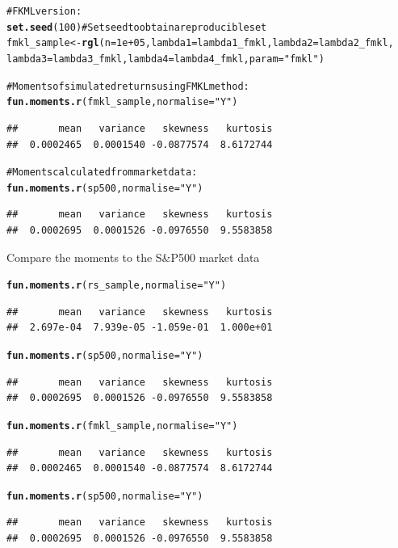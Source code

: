 \documentclass[12pt, a4paper, oneside]{article}\usepackage{graphicx, color}
\makeatletter
\newcommand{\hlfunctioncall}[1]{\textcolor[rgb]{0.501960784313725,0,0.329411764705882}{\textbf{#1}}}%
\newcommand{\hlstring}[1]{\textcolor[rgb]{0.6,0.6,1}{#1}}%
\newcommand{\hlcomment}[1]{\textcolor[rgb]{0.180392156862745,0.6,0.341176470588235}{#1}}%
\newenvironment{kframe}{%
 \def\at@end@of@kframe{}%
 \ifinner\ifhmode%
  \def\at@end@of@kframe{\end{minipage}}%
  \begin{minipage}{\columnwidth}%
 \fi\fi%
 \def\FrameCommand##1{\hskip\@totalleftmargin \hskip-\fboxsep
 \colorbox{shadecolor}{##1}\hskip-\fboxsep
     \hskip-\linewidth \hskip-\@totalleftmargin \hskip\columnwidth}%
 \MakeFramed {\advance\hsize-\width
   \@totalleftmargin\z@ \linewidth\hsize
   \@setminipage}}%
 {\par\unskip\endMakeFramed%
 \at@end@of@kframe}
\newenvironment{knitrout}{}{} %
\makeatother
\begin{document}
\begin{knitrout}
\begin{kframe}
\begin{alltt}
\hlcomment{# FKML version:}
\hlfunctioncall{set.seed}(100)  \hlcomment{# Set seed to obtain a reproducible set}
fmkl_sample <- \hlfunctioncall{rgl}(n = 1e+05, lambda1 = lambda1_fmkl, lambda2 = lambda2_fmkl, 
    lambda3 = lambda3_fmkl, lambda4 = lambda4_fmkl, param = \hlstring{"fmkl"})

\hlcomment{# Moments of simulated returns using FMKL method:}
\hlfunctioncall{fun.moments.r}(fmkl_sample, normalise = \hlstring{"Y"})
\end{alltt}
\begin{verbatim}
##       mean   variance   skewness   kurtosis 
##  0.0002465  0.0001540 -0.0877574  8.6172744
\end{verbatim}
\begin{alltt}

\hlcomment{# Moments calculated from market data:}
\hlfunctioncall{fun.moments.r}(sp500, normalise = \hlstring{"Y"})
\end{alltt}
\begin{verbatim}
##       mean   variance   skewness   kurtosis 
##  0.0002695  0.0001526 -0.0976550  9.5583858
\end{verbatim}
\end{kframe}
\end{knitrout}

Compare the moments to the S\&P500 market data
\begin{knitrout}
\color{fgcolor}\begin{kframe}
\begin{alltt}
\hlfunctioncall{fun.moments.r}(rs_sample, normalise = \hlstring{"Y"})
\end{alltt}
\begin{verbatim}
##       mean   variance   skewness   kurtosis 
##  2.697e-04  7.939e-05 -1.059e-01  1.000e+01
\end{verbatim}
\begin{alltt}
\hlfunctioncall{fun.moments.r}(sp500, normalise = \hlstring{"Y"})
\end{alltt}
\begin{verbatim}
##       mean   variance   skewness   kurtosis 
##  0.0002695  0.0001526 -0.0976550  9.5583858
\end{verbatim}
\begin{alltt}
\hlfunctioncall{fun.moments.r}(fmkl_sample, normalise = \hlstring{"Y"})
\end{alltt}
\begin{verbatim}
##       mean   variance   skewness   kurtosis 
##  0.0002465  0.0001540 -0.0877574  8.6172744
\end{verbatim}
\begin{alltt}
\hlfunctioncall{fun.moments.r}(sp500, normalise = \hlstring{"Y"})
\end{alltt}
\begin{verbatim}
##       mean   variance   skewness   kurtosis 
##  0.0002695  0.0001526 -0.0976550  9.5583858
\end{verbatim}
\end{kframe}
\end{knitrout}
\end{document}
